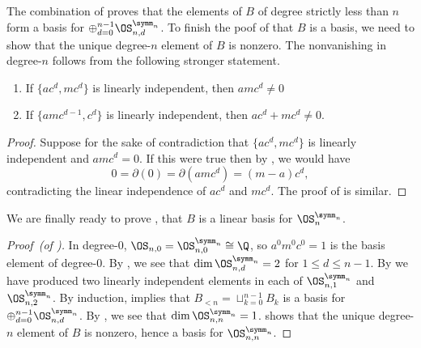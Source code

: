 \documentclass{amsart}
\begin{document}
The combination of  proves that the elements of $B$ of degree strictly less than $n$ form a basis for $\oplus_{d=0}^{n-1}\OS_{n,d}^{\symm_n}$.
To finish the poof of  that $B$ is a basis, we need to show that the unique degree-$n$ element of $B$ is nonzero.
The nonvanishing in degree-$n$ follows from the following stronger statement.

\begin{lemma}\label{lemma:LIimpliesNonzero}
    \begin{enumerate}
        \item If $\{ac^d, mc^d\}$ is linearly independent, then $amc^d \neq 0$
        
        \item\label{item:LIImpliesNonzero} If $\{amc^{d-1}, c^{d}\}$ is linearly independent, then $ac^{d}  + mc^{d} \neq 0$.
    \end{enumerate}
\end{lemma}
\begin{proof}
    Suppose for the sake of contradiction that $\{ac^d, mc^d\}$ is linearly independent and $amc^d = 0$.
    If this were true then by , we would have
    \[0 = \partial(0) = \partial(amc^d) = (m-a)c^d,\]
    contradicting the linear independence of $ac^d$ and $mc^d$.
    The proof of  is similar.
\end{proof}

We are finally ready to prove , that $B$ is a linear basis for $\OS_n^{\symm_n}$.

\begin{proof}[Proof~(of )]
    In degree-$0$, $\OS_{n,0} = \OS_{n,0}^{\symm_n} \cong \Q$, so $a^0m^0c^0 = 1$ is the basis element of degree-$0$.
    By , we see that $\dim \OS_{n,d}^{\symm_n} = 2$ for $1 \leq d \leq n-1$.
    By  we have produced two linearly independent elements in each of $\OS_{n,1}^{\symm_n}$ and $\OS_{n,2}^{\symm_n}$.
    By induction,  implies that $B_{<n}=\sqcup_{k=0}^{n-1} B_{k}$ is a basis for $\oplus_{d=0}^{n-1} \OS_{n,d}^{\symm_n}$.
    By , we see that $\dim \OS_{n,n}^{\symm_n} = 1$.
     shows that the unique degree-$n$ element of $B$ is nonzero, hence a basis for $\OS_{n,n}^{\symm_n}$.
\end{proof}
\end{document}
